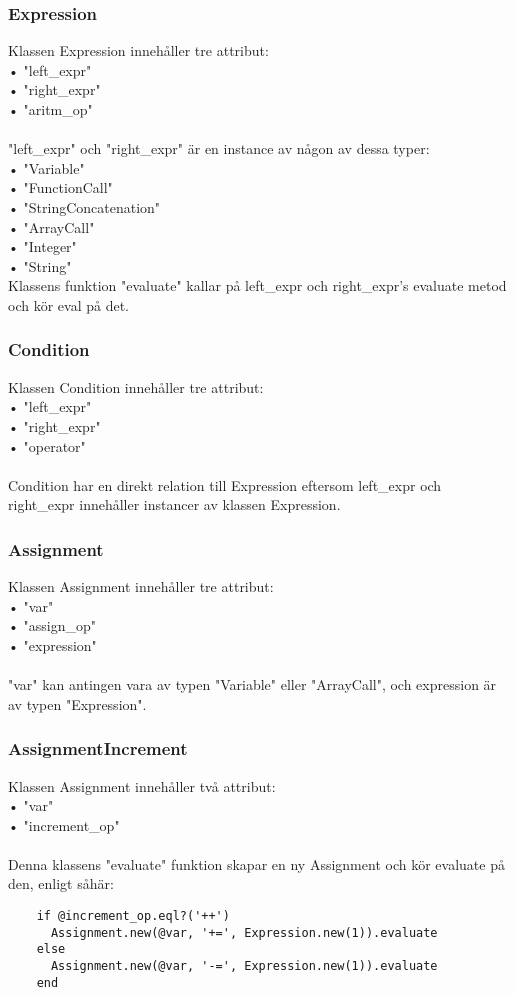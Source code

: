 \documentclass{TDP003mall}
\begin{document}
\subsubsection{Expression}
Klassen Expression innehåller tre attribut: \\
 • "left\_expr"\\
 • "right\_expr"\\
 • "aritm\_op"\\
\\
"left\_expr" och "right\_expr" är en instance av någon av dessa typer:\\
 • "Variable"\\
 • "FunctionCall"\\
 • "StringConcatenation"\\
 • "ArrayCall"\\
 • "Integer"\\
 • "String"\\
 
Klassens funktion "evaluate" kallar på left\_expr och right\_expr's evaluate metod och kör eval på det.

\subsubsection{Condition}
Klassen Condition innehåller tre attribut: \\
 • "left\_expr"\\
 • "right\_expr"\\
 • "operator"\\
\\
Condition har en direkt relation till Expression eftersom left\_expr och right\_expr innehåller instancer av klassen Expression.

\subsubsection{Assignment}
Klassen Assignment innehåller tre attribut: \\
 • "var"\\
 • "assign\_op"\\
 • "expression"\\
\\
"var" kan antingen vara av typen "Variable" eller "ArrayCall", och expression är av typen "Expression".

\subsubsection{AssignmentIncrement}
Klassen Assignment innehåller två attribut: \\
 • "var"\\
 • "increment\_op"\\
\\
Denna klassens "evaluate" funktion skapar en ny Assignment och kör evaluate på den, enligt såhär:
\begin{lstlisting}
    if @increment_op.eql?('++')
      Assignment.new(@var, '+=', Expression.new(1)).evaluate
    else
      Assignment.new(@var, '-=', Expression.new(1)).evaluate
    end
\end{lstlisting}
\end{document}
